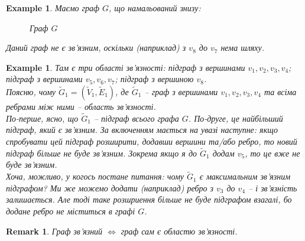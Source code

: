 \documentclass[a4paper, 14pt]{extarticle}
\theoremstyle{theoremdd}
\theoremstyle{theoremdd}
\theoremstyle{theoremdd}
\theoremstyle{theoremdd}
\theoremstyle{theoremdd}
\newtheorem{example}[theorem]{Example}
\theoremstyle{theoremdd}
\theoremstyle{theoremdd}
\theoremstyle{theoremdd}
\theoremstyle{theoremdd}
\theoremstyle{theoremdd}
\theoremstyle{theoremdd}
\newtheorem{remark}[theorem]{Remark}
\theoremstyle{theoremdd}
\theoremstyle{theoremdd}
\theoremstyle{theoremdd}
\theoremstyle{theoremdd}
\begin{document}
\begin{example}
Маємо граф $G$, що намальований знизу:
\begin{figure}[H]
\centering
{}
\caption*{Граф $G$}
\end{figure}
Даний граф не є зв'язним, оскільки (наприклад) з $v_8$ до $v_7$ нема шляху.
\end{example}

\begin{example}
Там є три області зв'язності: підграф з вершинами $v_1,v_2,v_3,v_4$; підграф з вершинами $v_5,v_6,v_7$; підграф з вершиною $v_8$.\\
Поясню, чому $\tilde{G}_1 = (\tilde{V}_1,\tilde{E}_1)$, де $\tilde{G}_1$ -- граф з вершинами $v_1,v_2,v_3,v_4$ та всіма ребрами між ними -- область зв'язності.\\
По-перше, ясно, що $\tilde{G}_1$ -- підграф всього графа $G$. По-друге, це найбільший підграф, який є зв'язним. За включенням мається на увазі наступне: якщо спробувати цей підграф розширити, додавши вершини та/або ребро, то новий підграф більше не буде зв'язним. Зокрема якщо я до $\tilde{G}_1$ додам $v_5$, то це вже не буде зв'язним.\\
Хоча, можливо, у когось постане питання: чому $\tilde{G}_1$ є максимальним зв'язним підграфом? Ми же можемо додати (наприклад) ребро з $v_3$ до $v_4$ -- і зв'язність залишається. Але тоді таке розшриення більше не буде підграфом взагалі, бо додане ребро не міститься в графі $G$.
\end{example}

\begin{remark}
Граф зв'язний $\iff$ граф сам є областю зв'язності.
\end{remark}
\end{document}
